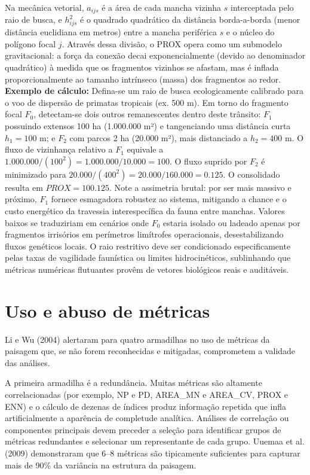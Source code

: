 \documentclass[
  portuguese,
  11pt,
  a4paper,
  open=any]{scrbook}
\begin{document}
Na mecânica vetorial, \(a_{ijs}\) é a área de cada mancha vizinha \(s\)
interceptada pelo raio de busca, e \(h_{ijs}^2\) é o quadrado quadrático
da distância borda-a-borda (menor distância euclidiana em metros) entre
a mancha periférica \(s\) e o núcleo do polígono focal \(j\). Através
dessa divisão, o PROX opera como um submodelo gravitacional: a força da
conexão decai exponencialmente (devido ao denominador quadrático) à
medida que os fragmentos vizinhos se afastam, mas é inflada
proporcionalmente ao tamanho intrínseco (massa) dos fragmentos ao redor.
\textbf{Exemplo de cálculo:} Defina-se um raio de busca ecologicamente
calibrado para o voo de dispersão de primatas tropicais (ex. 500 m). Em
torno do fragmento focal \(F_0\), detectam-se dois outros remanescentes
dentro deste trânsito: \(F_1\) possuindo extensos 100 ha (1.000.000 m²)
e tangenciando uma distância curta \(h_1 = 100\) m; e \(F_2\) com parcos
2 ha (20.000 m²), mais distanciado a \(h_2 = 400\) m. O fluxo de
vizinhança relativo a \(F_1\) equivale a
\(1.000.000 / (100^2) = 1.000.000 / 10.000 = 100\). O fluxo suprido por
\(F_2\) é minimizado para
\(20.000 / (400^2) = 20.000 / 160.000 = 0.125\). O consolidado resulta
em \(PROX = 100.125\). Note a assimetria brutal: por ser mais massivo e
próximo, \(F_1\) fornece esmagadora robustez ao sistema, mitigando a
chance e o custo energético da travessia interespecífica da fauna entre
manchas. Valores baixos se traduziriam em cenários onde \(F_0\) estaria
isolado ou ladeado apenas por fragmentos irrisórios em perímetros
limítrofes operacionais, desestabilizando fluxos genéticos locais. O
raio restritivo deve ser condicionado especificamente pelas taxas de
vagilidade faunística ou limites hidrocinéticos, sublinhando que
métricas numéricas flutuantes provêm de vetores biológicos reais e
auditáveis.

\section{Uso e abuso de métricas}\label{uso-e-abuso-de-muxe9tricas}

Li e Wu (2004) alertaram para quatro armadilhas no uso de métricas da
paisagem que, se não forem reconhecidas e mitigadas, comprometem a
validade das análises.

A primeira armadilha é a redundância. Muitas métricas são altamente
correlacionadas (por exemplo, NP e PD, AREA\_MN e AREA\_CV, PROX e ENN)
e o cálculo de dezenas de índices produz informação repetida que infla
artificialmente a aparência de completude analítica. Análises de
correlação ou componentes principais devem preceder a seleção para
identificar grupos de métricas redundantes e selecionar um representante
de cada grupo. Uuemaa et al. (2009) demonstraram que 6--8 métricas são
tipicamente suficientes para capturar mais de 90\% da variância na
estrutura da paisagem.
\end{document}
